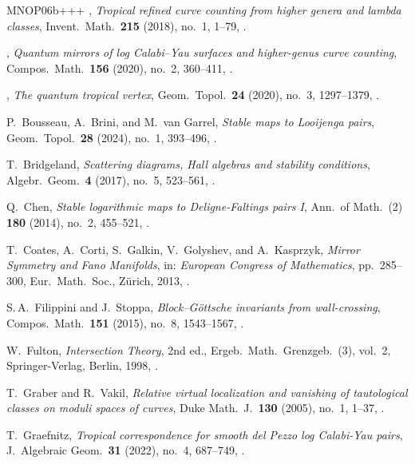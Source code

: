 \documentclass[11pt]{amsart}
\numberwithin{equation}{section}
\theoremstyle{plain}
\theoremstyle{remark}
\theoremstyle{definition}
\begin{document}
\begin{thebibliography}{MNOP06b+++}
\bysame, \emph{Tropical refined curve counting from higher genera and
  lambda classes}, Invent.\ Math.\ \textbf{215} (2018), no.~1, 
1--79,
  .

\bysame, \emph{Quantum mirrors of log {C}alabi--{Y}au surfaces and higher-genus
  curve counting}, Compos.\ Math.\ \textbf{156} (2020), no.~2, 
360--411,
  .

\bysame, \emph{The quantum tropical vertex}, Geom.\ Topol.\ \textbf{24} (2020),
  no.~3, 
1297--1379, .

P.~Bousseau, A.~Brini, and M.~van Garrel, \emph{Stable maps to Looijenga
  pairs}, Geom.\ Topol.\ \textbf{28} (2024), no.~1, 
393--496,  .

T.~Bridgeland, \emph{Scattering diagrams, {H}all algebras and stability
  conditions}, Algebr.\ Geom.\ \textbf{4} (2017), no.~5, 523--561,
  .

Q.~Chen, \emph{Stable logarithmic maps to {D}eligne-{F}altings pairs {I}}, Ann.\
  of Math.~(2) \textbf{180} (2014), no.~2, 455--521,
  .

T.~Coates, A.~Corti, S.~Galkin, V.~Golyshev, and A.~Kasprzyk, \emph{Mirror
  Symmetry and Fano Manifolds}, in: \emph{European {C}ongress of {M}athematics}, pp.~285--300, Eur.\ Math.\ Soc., Z\"{u}rich, 2013, .

S.\,A.~Filippini and J.~Stoppa, \emph{Block--{G}\"{o}ttsche invariants from
  wall-crossing}, Compos.\ Math.\ \textbf{151} (2015), no.~8, 
1543--1567,  .

  W.~Fulton, \emph{Intersection Theory}, 2nd ed., 
  Ergeb.\ Math.\ Grenzgeb.~(3), vol.~2, 
  Springer-Verlag, Berlin, 
  1998, .

T.~Graber and R.~Vakil, \emph{Relative virtual localization and vanishing of
  tautological classes on moduli spaces of curves}, Duke Math.~J.\ \textbf{130}
  (2005), no.~1, 1--37, \doi{10.1215/S0012-7094-05-13011-3}.

T.~Graefnitz, \emph{Tropical correspondence for smooth del Pezzo log
  Calabi-Yau pairs}, J.~Algebraic Geom.\ \textbf{31} (2022), no.~4,
  687--749, \doi{10.1090/jag/794}.


\end{thebibliography}
\end{document}
